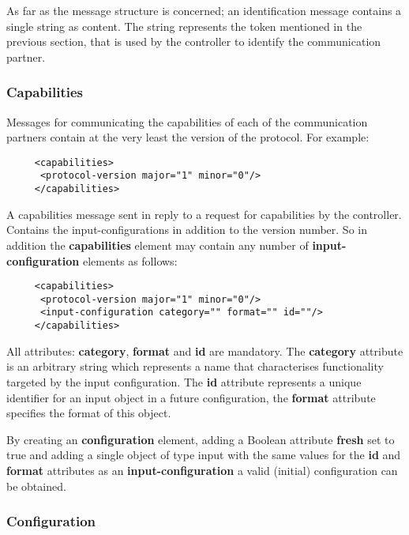 \documentclass{article}
\begin{document}
   As far as the message structure is concerned; an identification message
   contains a single string as content. The string represents the token
   mentioned in the previous section, that is used by the controller to
   identify the communication partner.

  \subsubsection{Capabilities}

   Messages for communicating the capabilities of each of the communication
   partners contain at the very least the version of the protocol. For example:

    \begin{verbatim}
     <capabilities>
      <protocol-version major="1" minor="0"/>
     </capabilities>\end{verbatim}

   A capabilities message sent in reply to a request for capabilities by the
   controller. Contains the input-configurations in addition to the version
   number. So in addition the \textbf{capabilities} element may contain any
   number of \textbf{input-configuration} elements as follows:

    \begin{verbatim}
     <capabilities>
      <protocol-version major="1" minor="0"/>
      <input-configuration category="" format="" id=""/>
     </capabilities>\end{verbatim}

    All attributes: \textbf{category}, \textbf{format} and \textbf{id} are
    mandatory.  The \textbf{category} attribute is an arbitrary string which
    represents a name that characterises functionality targeted by the input
    configuration. The \textbf{id} attribute represents a unique identifier for
    an input object in a future configuration, the \textbf{format} attribute
    specifies the format of this object.

    By creating an \textbf{configuration} element, adding a Boolean attribute
    \textbf{fresh} set to true and adding a single object of type input with
    the same values for the \textbf{id} and \textbf{format} attributes as an
    \textbf{input-configuration} a valid (initial) configuration can be obtained.

  \subsubsection{Configuration}
\end{document}
